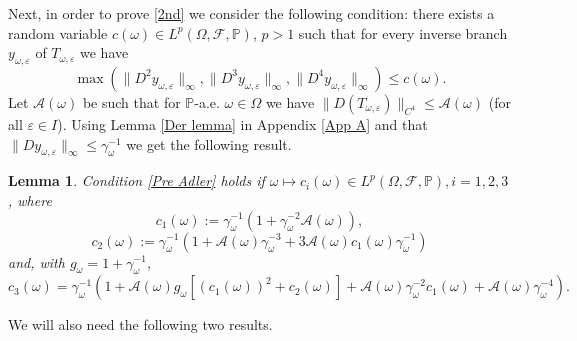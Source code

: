 \documentclass[11pt,reqno,a4paper]{article}
\newtheorem{lemma}[theorem]{Lemma}
\theoremstyle{special}
\def\om{\omega}
\begin{document}
Next, in order to prove \eqref{2nd} we consider the following condition: there exists a random variable $c(\omega)\in L^p (\Omega, \mathcal F, \mathbb P)$, $p>1$ such that for every inverse branch $y_{\omega,\varepsilon}$ of $T_{\omega, \varepsilon}$ we have 
\begin{equation}\label{Pre Adler}
\max(\|D^2 y_{\omega,\varepsilon}\|_\infty, \|D^3 y_{\omega,\varepsilon}\|_\infty, \|D^4 y_{\omega,\varepsilon}\|_\infty)\leq c(\omega).
\end{equation}
Let $\mathcal A(\om)$ be such that for $\mathbb P$-a.e. $\om \in \Omega$  we have $\|D(T_{\om, \varepsilon})\|_{C^4}\leq \mathcal A(\om)$ (for all $\varepsilon\in I$). Using Lemma \ref{Der lemma} in Appendix \ref{App A} and that $\|Dy_{\om,\varepsilon}\|_\infty\leq\gamma_\om^{-1}$ we get the following result.
\begin{lemma}\label{ver der}
Condition \eqref{Pre Adler} holds if $\omega\mapsto c_i(\om)\in L^p(\Omega,\mathcal F,\mathbb P), i=1,2,3$, where
\begin{equation}\label{1D1}
c_1(\om):=\gamma_\omega^{-1}\left(1+\gamma_\omega^{-2}\mathcal A(\om)%
\right),
\end{equation}
\begin{equation}\label{1D2}
c_2(\om):=\gamma_\om^{-1}\left(1%
+\mathcal A(\om)\gamma_{\om}^{-3}+%
3\mathcal A(\om)c_1(\om)\gamma_\om^{-1}\right)
\end{equation}
and, 
with $g_\om=1+\gamma_\om^{-1}$,
\begin{equation}\label{1D3}
c_3(\om)=\gamma_\om^{-1}\left(1+
\mathcal A(\om)g_\om[(c_1(\om))^2+c_2(\om)]+%
\mathcal A(\om)\gamma_\om^{-2}c_1(\om)+
\mathcal A(\om)\gamma_\om^{-4}\right).
\end{equation}
\end{lemma}


We will also need  the following two results.
\end{document}
